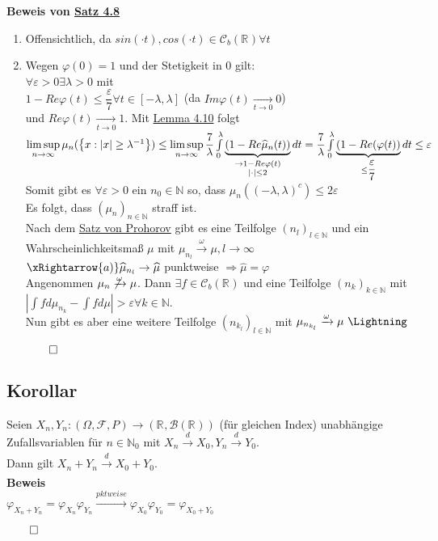 \documentclass[german,10pt,oneside, fleqn, a4paper]{article}
\let\marvosymLightning\Lightning
\newcommand {\R}	{\mathbb{R}}
\newcommand {\N}	{\mathbb{N}}
\newcommand{\Ra}	{\Rightarrow}
\newcommand{\ra}{\rightarrow}
\newcommand{\lsup}[1][n]{\limsup\limits_{#1\rightarrow\infty}}
\newcommand{\brc}[1]{\left(#1\right)}
\newcommand{\brac}[1]{\left\lbrace #1\right\rbrace}
\newcommand{\folge}[3][\N]{\left(#2_#3\right)_{#3\in #1}}
\newcommand{\QED}{\begin{flushright}$\qed$\end{flushright}}
\newcommand{\mc}[1]{\mathcal{#1}}
\newcommand{\beweis}{\textbf{Beweis}\\}
\newcommand{\toinf}{\rightarrow\infty}
\newcommand{\1}[1]{1_{#1}}
\newcommand{\2}[1]{\1{\brac{#1}}}
\newcommand{\xr}[2][]{\xrightarrow[#1]{#2}}
\newcommand{\cb}[1][d]{\mc{C}_b\brc{\R^{#1}}}
\newcommand{\rbor}[1][d]{\brc{\R^{#1},\mc{B}\brc{\R^{#1}}}}
\newcommand{\raum}{\brc{\Omega,\mc{F},P}}
\newcommand{\fe}{\forall\varepsilon>0}
\newcommand{\wid}{\text{\marvosymLightning}}
\begin{document}
\textbf{Beweis von \hyperref[4.8]{Satz 4.8}}
\begin{enumerate}[label=(\alph*)]
\item Offensichtlich, da $sin(\cdot t), cos(\cdot t)\in\cb[]\forall t$
\item Wegen $\varphi(0)=1$ und der Stetigkeit in 0 gilt:\\
$\fe\exists\lambda>0$ mit\\
$1-Re\varphi(t)\leq\dfrac{\varepsilon}{7}\forall t\in[-\lambda,\lambda]$ (da $Im\varphi(t)\xr[t\ra0]{}0$) \\
und $Re\varphi(t)\xr[t\ra0]{}1$.
Mit \hyperref[4.10]{Lemma 4.10} folgt\\
$\lsup \mu_n(\brac{x:|x|\geq\lambda^{-1}})\leq\lsup\dfrac{7}{\lambda}\int\limits_0^\lambda\underbrace{(1-Re\widehat{\mu}_n(t))}_{\substack{\ra 1-Re\varphi(t)\\|\cdot|\leq 2}}dt\\
=\dfrac{7}{\lambda}\int\limits_0^\lambda\underbrace{(1-Re(\varphi(t))}_{\leq\dfrac{\varepsilon}{7}}dt\leq\varepsilon$\\
Somit gibt es $\fe$ ein $n_0\in\N$ so, dass $\mu_n((-\lambda,\lambda)^c)\leq2\varepsilon$\\
Es folgt, dass $\folge{\mu}{n}$ straff ist.\\
Nach dem \hyperref[3.15]{Satz von Prohorov} gibt es eine Teilfolge $\folge{n}{l}$ und ein Wahrscheinlichkeitsmaß $\mu$ mit $\mu_{n_l}\xr{\omega}\mu, l\toinf$\\
$\xRightarrow{a)}\widehat{\mu}_{n_l}\ra\widehat{\mu}$ punktweise $\Ra\widehat{\mu}=\varphi$\\
Angenommen $\mu_n\not\xrightarrow{\omega}\mu$. Dann $\exists f\in\cb[]$ und eine Teilfolge $\folge{n}{k}$ mit\\
$\left|\int fd\mu_{n_k}-\int fd\mu\right|>\varepsilon\forall k\in\N$.\\
Nun gibt es aber eine weitere Teilfolge $\brc{n_{k_l}}_{l\in\N}$ mit $\mu_{n_{k_l}}\xr{\omega}\mu\ \wid$\QED
\end{enumerate}

\subsection{Korollar}
\label{4.11}
Seien $X_n,Y_n:\raum\ra\rbor[]$ (für gleichen Index) unabhängige Zufallsvariablen  für $n\in\N_0$ mit $X_n\xr{d}X_0,Y_n\xr{d}Y_0$.\\
Dann gilt $X_n+Y_n\xr{d}X_0+Y_0$.\\
\beweis
$\varphi_{X_n+Y_n}=\varphi_{X_n}\varphi_{Y_n}\xr{pktweise}\varphi_{X_0}\varphi_{Y_0}=\varphi_{X_0+Y_0}$\QED
\end{document}
